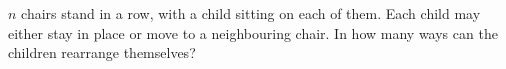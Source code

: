 $n$ chairs stand in a row, with a child sitting on each of them. Each child may either stay in place or move to a neighbouring chair. In how many ways can the children rearrange themselves?
